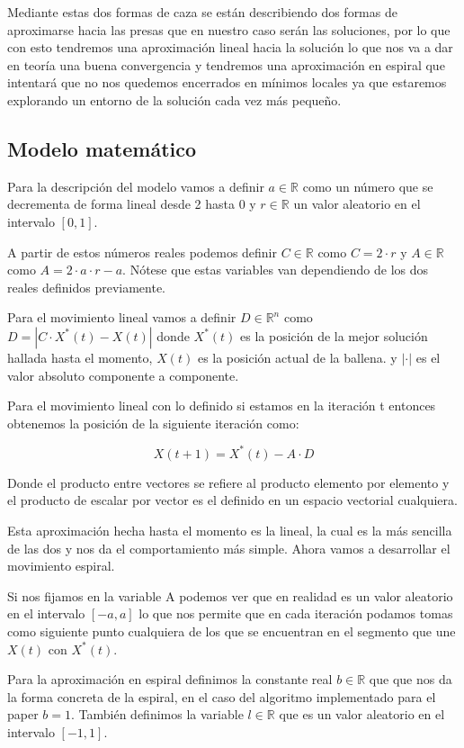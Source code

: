 \documentclass[12pt,a4paper]{article}
\begin{document}
		Mediante estas dos formas de caza se están describiendo dos formas de aproximarse hacia las presas que en nuestro caso serán las soluciones, por lo que con esto tendremos una aproximación lineal hacia la solución lo que nos va a dar en teoría una buena convergencia y tendremos una aproximación en espiral que intentará que no nos quedemos encerrados en mínimos locales ya que estaremos explorando un entorno de la solución cada vez más pequeño.
	
	\subsection{Modelo matemático}
	
		Para la descripción del modelo vamos a definir $a\in \mathbb{R}$ como un número que se decrementa de forma lineal desde 2 hasta 0 y $r\in \mathbb{R}$ un valor aleatorio en el intervalo $[0,1]$.
		
		A partir de estos números reales podemos definir $C\in \mathbb{R}$ como $C=2\cdot r$ y $A \in \mathbb{R}$ como $A = 2\cdot a \cdot r - a$. Nótese que estas variables van dependiendo de los dos reales definidos previamente.
		
		Para el movimiento lineal vamos a definir $D\in \mathbb{R}^n$ como $D=|C\cdot X^*(t)-X(t)|$ donde $X^*(t)$ es la posición de la mejor solución hallada hasta el momento, $X(t)$ es la posición actual de la ballena. y $|\cdot |$ es el valor absoluto componente a componente.
		
		Para el movimiento lineal con lo definido si estamos en la iteración t entonces obtenemos la posición de la siguiente iteración como:
		
		$$X(t+1) = X^*(t)-A\cdot D$$
		
		Donde el producto entre vectores se refiere al producto elemento por elemento y el producto de escalar por vector es el definido en un espacio vectorial cualquiera.
		
		Esta aproximación hecha hasta el momento es la lineal, la cual es la más sencilla de las dos y nos da el comportamiento más simple. Ahora vamos a desarrollar el movimiento espiral.
		
		Si nos fijamos en la variable A podemos ver que en realidad es un valor aleatorio en el intervalo $[-a,a]$ lo que nos permite que en cada iteración podamos tomas como siguiente punto cualquiera de los que se encuentran en el segmento que une $X(t)$ con $X^*(t)$.
		
		Para la aproximación en espiral definimos la constante real $b\in \mathbb{R}$ que que nos da la forma concreta de la espiral, en el caso del algoritmo implementado para el paper $b=1$. También definimos la variable $l\in \mathbb{R}$ que es un valor aleatorio en el intervalo $[-1,1]$.
		
\end{document}
